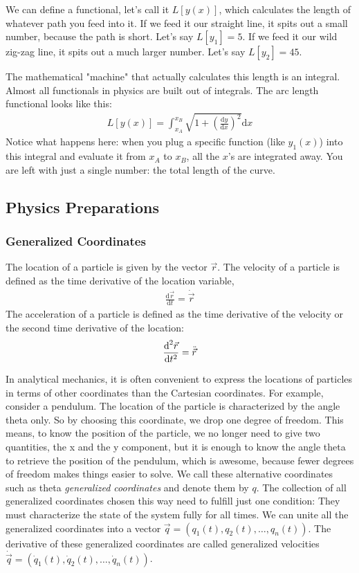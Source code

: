 \documentclass{article}
\begin{document}
	We can define a functional, let's call it $L[y(x)]$, which calculates the length of whatever path you feed into it. 
	If we feed it our straight line, it spits out a small number, because the path is short. Let's say $L[y_1] = 5$.
	If we feed it our wild zig-zag line, it spits out a much larger number. Let's say $L[y_2] = 45$.
	
	The mathematical "machine" that actually calculates this length is an integral. Almost all functionals in physics are built out of integrals. The arc length functional looks like this:
	\begin{align}
		L[y(x)] = \int_{x_A}^{x_B} \sqrt{1 + \left( \frac{\text{d}y}{\text{d}x} \right)^2} \text{d}x
	\end{align}
	Notice what happens here: when you plug a specific function (like $y_1(x)$) into this integral and evaluate it from $x_A$ to $x_B$, all the $x$'s are integrated away. You are left with just a single number: the total length of the curve.
	
	\subsection{Physics Preparations}
	\subsubsection{Generalized Coordinates}
	The location of a particle is given by the vector $\vec{r}$. \newline
	The velocity of a particle is defined as the time derivative of the location variable, 
	\begin{align}
		\frac{\text{d}\vec{r}}{\text{d}t} = \dot{\vec{r}}
	\end{align}
	The acceleration of a particle is defined as the time derivative of the velocity or the second time derivative of the location:
	\begin{align}
		\frac{\text{d}^2\vec{r}}{\text{d}t^2} = \Ddot{\vec{r}}
	\end{align}
	
	In analytical mechanics, it is often convenient to express the locations of particles in terms of other coordinates than the Cartesian coordinates. For example, consider a pendulum. The location of the particle is characterized by the angle theta only. So by choosing this coordinate, we drop one degree of freedom. This means, to know the position of the particle, we no longer need to give two quantities, the x and the y component, but it is enough to know the angle theta to retrieve the position of the pendulum, which is awesome, because fewer degrees of freedom makes things easier to solve. We call these alternative coordinates such as theta \textit{generalized coordinates} and denote them by $q$. The collection of all generalized coordinates chosen this way need to fulfill just one condition: They must characterize the state of the system fully for all times. We can unite all the generalized coordinates into a vector  $\vec{q}=(q_1(t), q_2(t), \dots, q_n(t))$. The derivative of these generalized coordinates are called generalized velocities $\dot{\vec{q}}=(\dot{q}_1(t), \dot{q}_2(t),\dots,\dot{q}_n(t))$.
	
\end{document}
